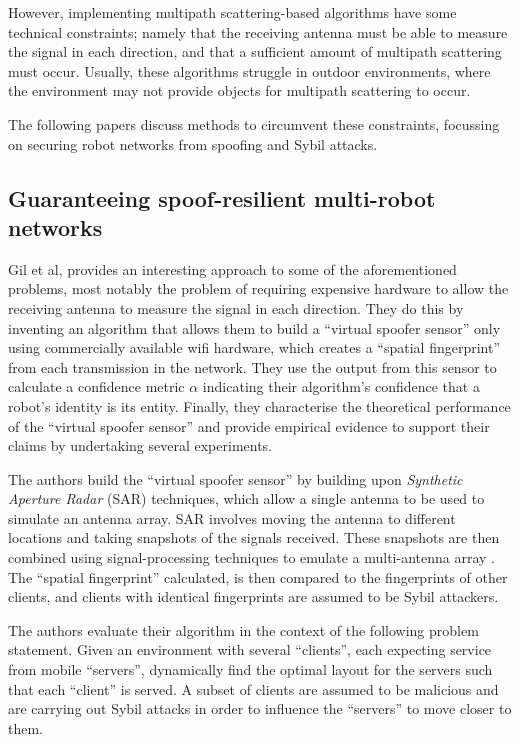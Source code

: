However, implementing multipath scattering-based algorithms have some technical constraints; namely that the receiving antenna must be able to measure the signal in each direction, and that a sufficient amount of multipath scattering must occur. Usually, these algorithms struggle in outdoor environments, where the environment may not provide objects for multipath scattering to occur\citationneeded.

The following papers discuss methods to circumvent these constraints, focussing on securing robot networks from spoofing and Sybil attacks. 

\subsection{Guaranteeing spoof-resilient multi-robot networks}
Gil et al, \cite{GuaranteeingSpoofResilience} provides an interesting approach to some of the aforementioned problems, most notably the problem of requiring expensive hardware to allow the receiving antenna to measure the signal in each direction. They do this by inventing an algorithm that allows them to build a ``virtual spoofer sensor'' only using commercially available wifi hardware, which creates a ``spatial fingerprint'' from each transmission in the network. They use the output from this sensor to calculate a confidence metric $\alpha$ indicating their algorithm's confidence that a robot's identity is its entity. Finally, they characterise the theoretical performance of the ``virtual spoofer sensor'' and provide empirical evidence to support their claims by undertaking several experiments.

The authors build the ``virtual spoofer sensor'' by building upon \textit{Synthetic Aperture Radar} (SAR) techniques, which allow a single antenna to be used to simulate an antenna array. SAR involves moving the antenna to different locations and taking snapshots of the signals received. These snapshots are then combined using signal-processing techniques to emulate a multi-antenna array \cite{BAD_SAR}.
The ``spatial fingerprint'' calculated, is then compared to the fingerprints of other clients, and clients with identical fingerprints are assumed to be Sybil attackers.

The authors evaluate their algorithm in the context of the following problem statement. Given an environment with several ``clients'', each expecting service from mobile ``servers'', dynamically find the optimal layout for the servers such that each ``client'' is served. A subset of clients are assumed to be malicious and are carrying out Sybil attacks in order to influence the ``servers'' to move closer to them.


